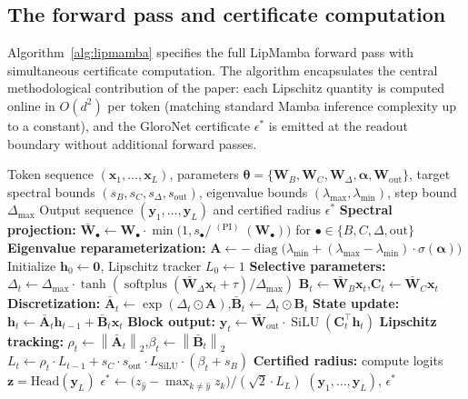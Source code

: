 \documentclass[12pt,a4paper]{article}
\theoremstyle{definition}
\theoremstyle{remark}
\newcommand{\modelname}{LipMamba}
\newcommand{\norm}[1]{\left\|#1\right\|}
\DeclareMathOperator{\softplus}{softplus}
\DeclareMathOperator{\diag}{diag}
\DeclareMathOperator{\sigmamax}{\sigma_{max}}
\DeclareMathOperator{\SiLU}{SiLU}
\begin{document}
\subsection{The forward pass and certificate computation}
\label{subsec:algorithm}

Algorithm~\ref{alg:lipmamba} specifies the full \modelname{} forward pass with simultaneous certificate computation. The algorithm encapsulates the central methodological contribution of the paper: each Lipschitz quantity is computed online in $O(d^2)$ per token (matching standard Mamba inference complexity up to a constant), and the GloroNet certificate $\epsilon^*$ is emitted at the readout boundary without additional forward passes.

\begin{algorithm}[!t]
\small
\caption{\modelname{} Forward Pass with Certified Radius}
\label{alg:lipmamba}
\begin{algorithmic}[1]
\REQUIRE Token sequence $(\mathbf{x}_1, \ldots, \mathbf{x}_L)$, parameters $\bm{\theta} = \{\mathbf{W}_B, \mathbf{W}_C, \mathbf{W}_\Delta, \bm{\alpha}, \mathbf{W}_{\mathrm{out}}\}$, target spectral bounds $(s_B, s_C, s_\Delta, s_{\mathrm{out}})$, eigenvalue bounds $(\lambda_{\max}, \lambda_{\min})$, step bound $\Delta_{\max}$
\ENSURE Output sequence $(\mathbf{y}_1, \ldots, \mathbf{y}_L)$ and certified radius $\epsilon^*$
\STATE \textbf{Spectral projection:} $\bar{\mathbf{W}}_\bullet \gets \mathbf{W}_\bullet \cdot \min\bigl(1, s_\bullet / \sigmamax^{\mathrm{(PI)}}(\mathbf{W}_\bullet)\bigr)$ for $\bullet \in \{B, C, \Delta, \mathrm{out}\}$ \quad {}
\STATE \textbf{Eigenvalue reparameterization:} $\mathbf{A} \gets -\diag\bigl(\lambda_{\min} + (\lambda_{\max} - \lambda_{\min}) \cdot \sigma(\bm{\alpha})\bigr)$
\STATE Initialize $\mathbf{h}_0 \gets \mathbf{0}$, Lipschitz tracker $L_0 \gets 1$
    \STATE \textbf{Selective parameters:} $\Delta_t \gets \Delta_{\max} \cdot \tanh(\softplus(\bar{\mathbf{W}}_\Delta \mathbf{x}_t + \tau) / \Delta_{\max})$
    \STATE \quad $\mathbf{B}_t \gets \bar{\mathbf{W}}_B \mathbf{x}_t$,\quad $\mathbf{C}_t \gets \bar{\mathbf{W}}_C \mathbf{x}_t$
    \STATE \textbf{Discretization:} $\bar{\mathbf{A}}_t \gets \exp(\Delta_t \odot \mathbf{A})$,\quad $\bar{\mathbf{B}}_t \gets \Delta_t \odot \mathbf{B}_t$
    \STATE \textbf{State update:} $\mathbf{h}_t \gets \bar{\mathbf{A}}_t \mathbf{h}_{t-1} + \bar{\mathbf{B}}_t \mathbf{x}_t$
    \STATE \textbf{Block output:} $\mathbf{y}_t \gets \bar{\mathbf{W}}_{\mathrm{out}} \cdot \SiLU(\mathbf{C}_t^\top \mathbf{h}_t)$
    \STATE \textbf{Lipschitz tracking:} $\rho_t \gets \norm{\bar{\mathbf{A}}_t}_2$,\quad $\beta_t \gets \norm{\bar{\mathbf{B}}_t}_2$
    \STATE \quad $L_t \gets \rho_t \cdot L_{t-1} + s_C \cdot s_{\mathrm{out}} \cdot L_{\SiLU} \cdot (\beta_t + s_B)$
\ENDFOR
\STATE \textbf{Certified radius:} compute logits $\mathbf{z} = \mathrm{Head}(\mathbf{y}_L)$
\STATE \quad $\epsilon^* \gets \bigl(z_{\hat{y}} - \max_{k \neq \hat{y}} z_k\bigr) / (\sqrt{2} \cdot L_L)$ \quad {}
\RETURN $(\mathbf{y}_1, \ldots, \mathbf{y}_L)$, $\epsilon^*$
\end{algorithmic}
\end{algorithm}
\end{document}
